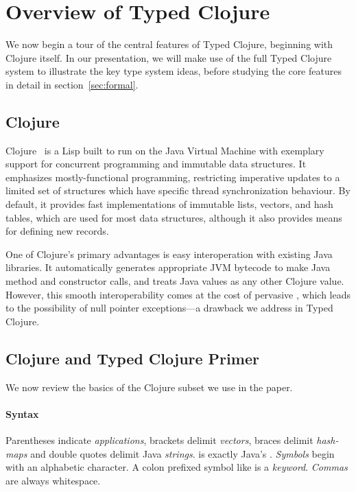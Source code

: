 \section{Overview of Typed Clojure}

\label{sec:overview}

We now begin a tour of the central features of Typed Clojure,
beginning with Clojure itself. In our presentation, we will make 
use of the full Typed Clojure system to illustrate the key type system
ideas, before studying the core features in detail in
section~\ref{sec:formal}. 

\subsection{Clojure}

Clojure~\cite{Hic08} is a Lisp built to run on the
Java Virtual Machine with exemplary support for concurrent programming
and immutable data structures. It emphasizes mostly-functional
programming, restricting imperative updates to a limited set of
structures which have specific thread synchronization behaviour. By
default, it provides fast implementations of immutable lists, vectors,
and hash tables, which are used for most data structures, although it
also provides means for defining new records.

One of Clojure's primary advantages is easy interoperation with
existing Java libraries. It automatically generates appropriate JVM
bytecode to make Java method and constructor calls, and treats Java
values as any other Clojure value. However, this smooth
interoperability comes at the cost of pervasive , which
leads to the possibility of null pointer exceptions---a drawback we
address in Typed Clojure.

\subsection{Clojure and Typed Clojure Primer}

We now review the basics of the Clojure subset we use in the paper.

\paragraph{Syntax} Parentheses indicate \emph{applications}, brackets
delimit
\emph{vectors}, braces
delimit
\emph{hash-maps}
and double quotes delimit Java \emph{strings}.
 is exactly Java's .
\emph{Symbols} begin with an alphabetic character.
A colon prefixed symbol like  is a \emph{keyword}.
\emph{Commas} are always whitespace.


